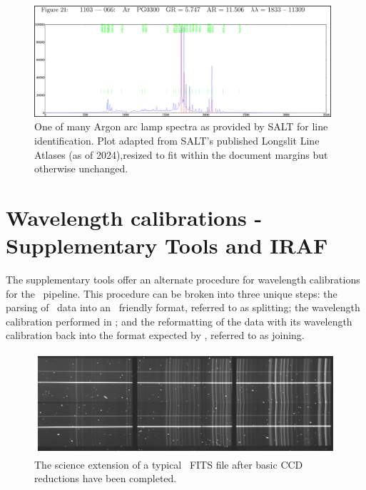\begin{figure}[t]
    \centering
    \includegraphics[width = 0.98\textwidth]{figures/3_arc_spectrum.png}
    \caption{One of many Argon arc lamp spectra as provided by \gls{SALT} for line identification. Plot adapted from \gls{SALT}'s published Longslit Line Atlases (as of 2024),\protect\footnotemark resized to fit within the document margins but otherwise unchanged.}
    \label{fig:ar_arc_salt}
\end{figure}


\section{Wavelength calibrations - Supplementary Tools and IRAF} \label{sec:mod_tools}

The supplementary tools offer an alternate procedure for wavelength calibrations for the \polsalt\ pipeline. This procedure can be broken into three unique steps: the parsing of \polsalt\ data into an \iraf\ friendly format, referred to as splitting; the wavelength calibration performed in \iraf; and the reformatting of the data with its wavelength calibration back into the format expected by \polsalt, referred to as joining.

\begin{figure}[t]
    \centering
    \includegraphics[width = 1.0\textwidth]{figures/3_pre_wav_cal.pdf}
    \caption{The science extension of a typical \polsalt\ \acs{FITS} file after basic \gls{CCD} reductions have been completed.}
    \label{fig:polsalt_pre_wav_cal}
\end{figure}


